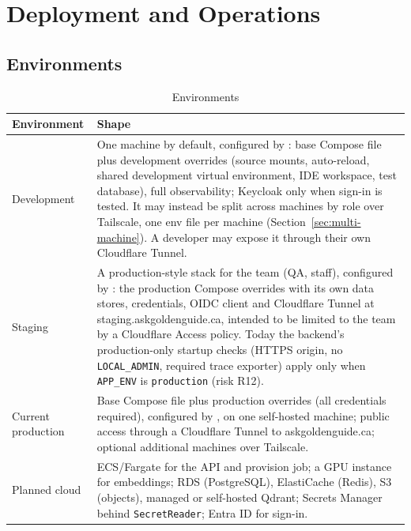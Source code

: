\documentclass[11pt,letterpaper]{report}
\begin{document}
\chapter{Deployment and Operations}\label{ch:deployment}

\section{Environments}
\begin{table}[H]
\centering
\caption{Environments}\label{tab:envs}
\begin{tabularx}{\textwidth}{@{}P{3.0cm}L@{}}
\toprule
\textbf{Environment} & \textbf{Shape} \\
\midrule
Development & One machine by default, configured by : base Compose file plus development overrides (source mounts, auto-reload, shared development virtual environment, IDE workspace, test database), full observability; Keycloak only when sign-in is tested. It may instead be split across machines by role over Tailscale, one env file per machine (Section~\ref{sec:multi-machine}). A developer may expose it through their own Cloudflare Tunnel. \\
Staging & A production-style stack for the team (QA, staff), configured by : the production Compose overrides with its own data stores, credentials, OIDC client and Cloudflare Tunnel at staging.askgoldenguide.ca, intended to be limited to the team by a Cloudflare Access policy. Today the backend's production-only startup checks (HTTPS origin, no \texttt{LOCAL\_ADMIN}, required trace exporter) apply only when \texttt{APP\_ENV} is \texttt{production} (risk R12). \\
Current production & Base Compose file plus production overrides (all credentials required), configured by , on one self-hosted machine; public access through a Cloudflare Tunnel to askgoldenguide.ca; optional additional machines over Tailscale. \\
Planned cloud & ECS/Fargate for the API and provision job; a GPU instance for embeddings; RDS (PostgreSQL), ElastiCache (Redis), S3 (objects), managed or self-hosted Qdrant; Secrets Manager behind \texttt{SecretReader}; Entra ID for sign-in. \\
\bottomrule
\end{tabularx}
\end{table}
\end{document}

